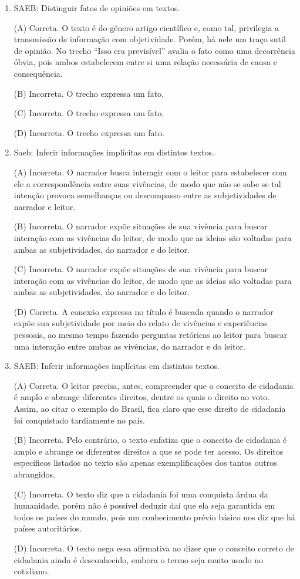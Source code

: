 \begin{enumerate}
	\item
SAEB: Distinguir fatos de opiniões em textos.

(A) Correta. O texto é do gênero artigo científico e, como tal,
privilegia a transmissão de informação com objetividade. Porém, há nele
um traço sutil de opinião. No trecho ``Isso era previsível'' avalia o
fato como uma decorrência óbvia, pois ambos estabelecem entre si uma
relação necessária de causa e consequência. 

(B) Incorreta. O trecho
expressa um fato. 

(C) Incorreta. O trecho expressa um fato. 

(D) Incorreta. O trecho expressa um fato.

\item

Saeb: Inferir informações implícitas em distintos textos.

(A) Incorreta. O narrador busca interagir com o leitor para estabelecer
com ele a correspondência entre suas vivências, de modo que não se sabe
se tal intenção provoca semelhanças ou descompasso entre as
subjetividades de narrador e leitor. 

(B) Incorreta. O narrador expõe
situações de sua vivência para buscar interação com as vivências do
leitor, de modo que as ideias são voltadas para ambas as subjetividades,
do narrador e do leitor. 

(C) Incorreta. O narrador expõe situações de
sua vivência para buscar interação com as vivências do leitor, de modo
que as ideias são voltadas para ambas as subjetividades, do narrador e
do leitor. 

(D) Correta. A conexão expressa no título é buscada quando o
narrador expõe sua subjetividade por meio do relato de vivências e
experiências pessoais, ao mesmo tempo fazendo perguntas retóricas ao
leitor para buscar uma interação entre ambas as vivências, do narrador e
do leitor.

\item
SAEB: Inferir informações implícitas em distintos textos.

(A) Correta. O leitor precisa, antes, compreender que o conceito de
cidadania é amplo e abrange diferentes direitos, dentre os quais o
direito ao voto. Assim, ao citar o exemplo do Brasil, fica claro que
esse direito de cidadania foi conquistado tardiamente no país. 

(B) Incorreta. Pelo contrário, o texto enfatiza que o conceito de cidadania
é amplo e abrange os diferentes direitos a que se pode ter acesso. Os
direitos específicos listados no texto são apenas exemplificações dos
tantos outros abrangidos. 

(C) Incorreta. O texto diz que a cidadania foi
uma conquista árdua da humanidade, porém não é possível deduzir daí que
ela seja garantida em todos os países do mundo, pois um conhecimento
prévio básico nos diz que há países autoritários. 

(D) Incorreta. O texto
nega essa afirmativa ao dizer que o conceito correto de cidadania ainda
é desconhecido, embora o termo seja muito usado no cotidiano.
\end{enumerate}

